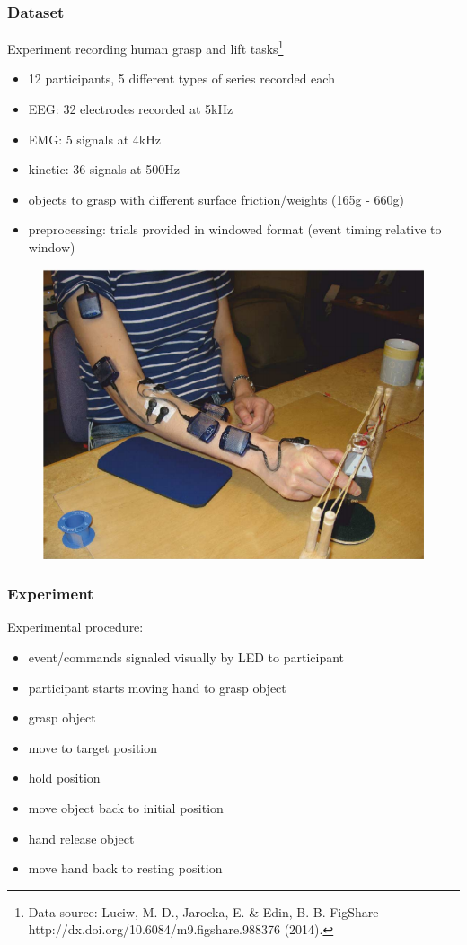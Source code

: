 \documentclass{beamer}
\begin{document}
\begin{frame}
\frametitle{Dataset}
Experiment recording human grasp and lift tasks\footnote{Data source: Luciw, M. D., Jarocka, E. \& Edin, B. B. FigShare http://dx.doi.org/10.6084/m9.figshare.988376 (2014).}
\begin{itemize}
	\item 12 participants, 5 different types of series recorded each
	\item EEG: 32 electrodes recorded at 5kHz
	\item EMG: 5 signals at 4kHz
	\item kinetic: 36 signals at 500Hz
	\item objects to grasp with different surface friction/weights (165g - 660g)
	\item preprocessing: trials provided in windowed format (event timing relative to window)
\end{itemize}
\begin{figure}[ht]
    \centering
    \includegraphics[scale=.15]{images/experiment.png}
	\label{fig1}
\end{figure}
\end{frame}


\begin{frame}
\frametitle{Experiment}

Experimental procedure:
\begin{itemize}
	\item event/commands signaled visually by LED to participant
	\item participant starts moving hand to grasp object
    \item grasp object
    \item move to target position
    \item hold position
    \item move object back to initial position
    \item hand release object
    \item move hand back to resting position
\end{itemize}
	
\end{frame}
\end{document}
